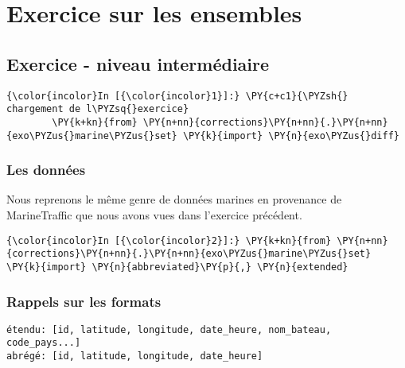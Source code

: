     
    
    
    

    

    \hypertarget{exercice-sur-les-ensembles}{%
\section{Exercice sur les ensembles}\label{exercice-sur-les-ensembles}}

    \hypertarget{exercice---niveau-intermuxe9diaire}{%
\subsection{Exercice - niveau
intermédiaire}\label{exercice---niveau-intermuxe9diaire}}

    \begin{Verbatim}[commandchars=\\\{\},frame=single,framerule=0.3mm,rulecolor=\color{cellframecolor}]
{\color{incolor}In [{\color{incolor}1}]:} \PY{c+c1}{\PYZsh{} chargement de l\PYZsq{}exercice}
        \PY{k+kn}{from} \PY{n+nn}{corrections}\PY{n+nn}{.}\PY{n+nn}{exo\PYZus{}marine\PYZus{}set} \PY{k}{import} \PY{n}{exo\PYZus{}diff}
\end{Verbatim}


    \hypertarget{les-donnuxe9es}{%
\subsubsection{Les données}\label{les-donnuxe9es}}

    Nous reprenons le même genre de données marines en provenance de
MarineTraffic que nous avons vues dans l'exercice précédent.

    \begin{Verbatim}[commandchars=\\\{\},frame=single,framerule=0.3mm,rulecolor=\color{cellframecolor}]
{\color{incolor}In [{\color{incolor}2}]:} \PY{k+kn}{from} \PY{n+nn}{corrections}\PY{n+nn}{.}\PY{n+nn}{exo\PYZus{}marine\PYZus{}set} \PY{k}{import} \PY{n}{abbreviated}\PY{p}{,} \PY{n}{extended}
\end{Verbatim}


    \hypertarget{rappels-sur-les-formats}{%
\subsubsection{Rappels sur les formats}\label{rappels-sur-les-formats}}

    \begin{verbatim}
étendu: [id, latitude, longitude, date_heure, nom_bateau, code_pays...]
abrégé: [id, latitude, longitude, date_heure]
\end{verbatim}


